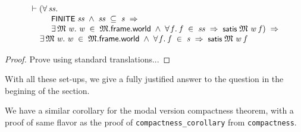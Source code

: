 \documentclass[letterpaper]{article}
\renewcommand{\HOLConst}[1]{{\textsf{\upshape\small #1}}}
\newenvironment{holmath}{\begin{displaymath}\begin{array}{l}}{\end{array}\end{displaymath}\ignorespacesafterend}
\begin{document}
\begin{holmath}
  \ensuremath{\HOLTokenTurnstile}(\HOLSymConst{\HOLTokenForall{}}\HOLBoundVar{ss}.\\
\;\;\;\;\;\;\;\;\;\;\HOLConst{FINITE}\;\HOLBoundVar{ss}\;\HOLSymConst{\HOLTokenConj{}}\;\HOLBoundVar{ss}\;\HOLSymConst{\HOLTokenSubset{}}\;\HOLFreeVar{s}\;\HOLSymConst{\HOLTokenImp{}}\\
\;\;\;\;\;\;\;\;\;\;\HOLSymConst{\HOLTokenExists{}}\HOLBoundVar{\ensuremath{\mathfrak{M}}}\;\HOLBoundVar{w}.\;\HOLBoundVar{w}\;\HOLSymConst{\HOLTokenIn{}}\;\HOLBoundVar{\ensuremath{\mathfrak{M}}}.\HOLFieldName{frame}.\HOLFieldName{world}\;\HOLSymConst{\HOLTokenConj{}}\;\HOLSymConst{\HOLTokenForall{}}\HOLBoundVar{f}.\;\HOLBoundVar{f}\;\HOLSymConst{\HOLTokenIn{}}\;\HOLBoundVar{ss}\;\HOLSymConst{\HOLTokenImp{}}\;\HOLConst{satis}\;\HOLBoundVar{\ensuremath{\mathfrak{M}}}\;\HOLBoundVar{w}\;\HOLBoundVar{f})\;\HOLSymConst{\HOLTokenImp{}}\\
\;\;\;\;\;\HOLSymConst{\HOLTokenExists{}}\HOLBoundVar{\ensuremath{\mathfrak{M}}}\;\HOLBoundVar{w}.\;\HOLBoundVar{w}\;\HOLSymConst{\HOLTokenIn{}}\;\HOLBoundVar{\ensuremath{\mathfrak{M}}}.\HOLFieldName{frame}.\HOLFieldName{world}\;\HOLSymConst{\HOLTokenConj{}}\;\HOLSymConst{\HOLTokenForall{}}\HOLBoundVar{f}.\;\HOLBoundVar{f}\;\HOLSymConst{\HOLTokenIn{}}\;\HOLFreeVar{s}\;\HOLSymConst{\HOLTokenImp{}}\;\HOLConst{satis}\;\HOLBoundVar{\ensuremath{\mathfrak{M}}}\;\HOLBoundVar{w}\;\HOLBoundVar{f}
\end{holmath}
\begin{proof}
Prove using standard translations...
\end{proof}
With all these set-ups, we give a fully justified answer to the question in the begining of the section. 

We have a similar corollary for the modal version compactness theorem, with a proof of same flavor as the proof of \texttt{compactness_corollary} from \texttt{compactness}.
\end{document}
